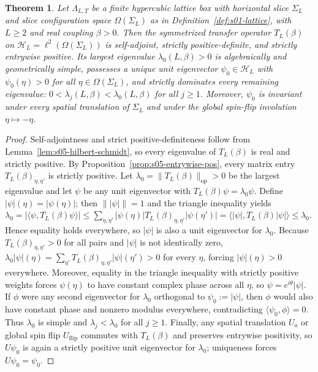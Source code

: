 \documentclass[11pt]{article}
\newtheorem{theorem}{Theorem}[section]
\theoremstyle{definition}
\begin{document}
\begin{theorem}
\label{thm:s05-transfer}
Let $\Lambda_{L,T}$ be a finite hypercubic lattice box with horizontal slice
$\Sigma_L$ and slice configuration space $\Omega(\Sigma_L)$ as in
Definition~\ref{def:s01-lattice}, with $L \ge 2$ and real coupling $\beta > 0$. Then
the symmetrized transfer operator $T_L(\beta)$ on $\mathcal{H}_L =
\ell^2(\Omega(\Sigma_L))$ is self-adjoint, strictly positive-definite, and strictly
entrywise positive. Its largest eigenvalue $\lambda_0(L, \beta) > 0$ is
algebraically and geometrically simple, possesses a unique unit eigenvector $\psi_0
\in \mathcal{H}_L$ with $\psi_0(\eta) > 0$ for all $\eta \in \Omega(\Sigma_L)$, and
strictly dominates every remaining eigenvalue: $0 < \lambda_j(L, \beta) <
\lambda_0(L, \beta)$ for all $j \ge 1$. Moreover, $\psi_0$ is invariant under every
spatial translation of $\Sigma_L$ and under the global spin-flip involution $\eta
\mapsto -\eta$.
\end{theorem}
\begin{proof}
Self-adjointness and strict positive-definiteness follow from
Lemma~\ref{lem:s05-hilbert-schmidt}, so every eigenvalue of $T_L(\beta)$ is real and
strictly positive. By Proposition~\ref{prop:s05-entrywise-pos}, every matrix entry
$T_L(\beta)_{\eta, \eta'}$ is strictly positive. Let $\lambda_0 =
\|T_L(\beta)\|_{\mathrm{op}} > 0$ be the largest eigenvalue and let $\psi$ be any
unit eigenvector with $T_L(\beta) \psi = \lambda_0 \psi$. Define $|\psi|(\eta) =
|\psi(\eta)|$; then $\||\psi|\| = 1$ and the triangle inequality yields $\lambda_0 =
|\langle \psi, T_L(\beta) \psi \rangle| \le \sum_{\eta, \eta'} |\psi(\eta)|
T_L(\beta)_{\eta, \eta'} |\psi(\eta')| = \langle |\psi|, T_L(\beta) |\psi| \rangle
\le \lambda_0$. Hence equality holds everywhere, so $|\psi|$ is also a unit
eigenvector for $\lambda_0$. Because $T_L(\beta)_{\eta, \eta'} > 0$ for all pairs
and $|\psi|$ is not identically zero, $\lambda_0 |\psi|(\eta) = \sum_{\eta'}
T_L(\beta)_{\eta, \eta'} |\psi|(\eta') > 0$ for every $\eta$, forcing $|\psi|(\eta)
> 0$ everywhere. Moreover, equality in the triangle inequality with strictly
positive weights forces $\psi(\eta)$ to have constant complex phase across all
$\eta$, so $\psi = e^{i\theta} |\psi|$. If $\phi$ were any second eigenvector for
$\lambda_0$ orthogonal to $\psi_0 := |\psi|$, then $\phi$ would also have constant
phase and nonzero modulus everywhere, contradicting $\langle \psi_0, \phi \rangle =
0$. Thus $\lambda_0$ is simple and $\lambda_j < \lambda_0$ for all $j \ge 1$.
Finally, any spatial translation $U_a$ or global spin flip $U_{\mathrm{flip}}$
commutes with $T_L(\beta)$ and preserves entrywise positivity, so $U \psi_0$ is
again a strictly positive unit eigenvector for $\lambda_0$; uniqueness forces $U
\psi_0 = \psi_0$.
\end{proof}
\end{document}
